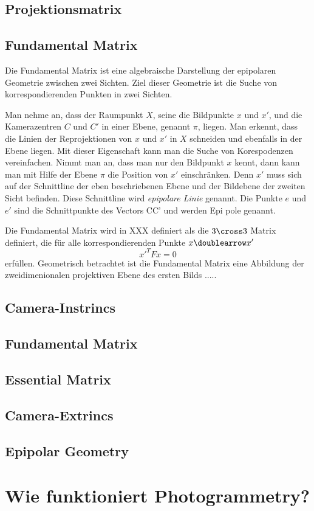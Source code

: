 \subsection{Projektionsmatrix}

\subsection{Fundamental Matrix}
Die Fundamental Matrix ist eine algebraische Darstellung der epipolaren Geometrie zwischen zwei Sichten.
Ziel dieser Geometrie ist die Suche von korrespondierenden Punkten in zwei Sichten.

Man nehme an, dass der Raumpunkt $X$, seine die Bildpunkte $x$ und $x'$, und die Kamerazentren $C$ und $C'$ in einer Ebene, genannt $\pi$, liegen.
Man erkennt, dass die Linien der Reprojektionen von $x$ und $x'$ in $X$ schneiden und ebenfalls in der Ebene liegen.
Mit dieser Eigenschaft kann man die Suche von Korespodenzen vereinfachen.
Nimmt man an, dass man nur den Bildpunkt $x$ kennt, dann kann man mit Hilfe der Ebene $\pi$ die Position von $x'$ einschränken.
Denn $x'$ muss sich auf der Schnittline der eben beschriebenen Ebene und der Bildebene der zweiten Sicht befinden. 
Diese Schnittline wird \emph{epipolare Linie} genannt.
Die Punkte $e$ und $e'$ sind die Schnittpunkte des Vectors CC' und werden Epi pole genannt. 

Die Fundamental Matrix wird in XXX definiert als die $3\cross 3$ Matrix definiert, die für alle korrespondierenden Punkte $x \doublearrow x'$ 
\[ x'^TFx=0\] 
erfüllen.
Geometrisch betrachtet ist die Fundamental Matrix eine Abbildung der zweidimenionalen projektiven Ebene des ersten Bilds .....





\subsection{Camera-Instrincs}
\subsection{Fundamental Matrix}
\subsection{Essential Matrix}
\subsection{Camera-Extrincs}
\subsection{Epipolar Geometry}

\section{Wie funktioniert Photogrammetry?}
